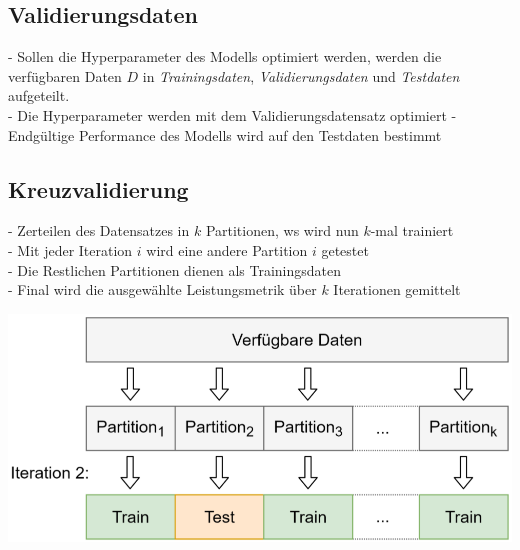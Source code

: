 \documentclass{report}
\begin{document}
\subsection{Validierungsdaten}
- Sollen die Hyperparameter des Modells optimiert werden, werden die verfügbaren Daten $D$
in \textit{Trainingsdaten}, \textit{Validierungsdaten} und \textit{Testdaten} aufgeteilt.\\
- Die Hyperparameter werden mit dem Validierungsdatensatz optimiert
- Endgültige Performance des Modells wird auf den Testdaten bestimmt

\subsection{Kreuzvalidierung}
- Zerteilen des Datensatzes in $k$ Partitionen, ws wird nun $k$-mal trainiert\\
- Mit jeder Iteration $i$ wird eine andere Partition $i$ getestet\\
- Die Restlichen Partitionen dienen als Trainingsdaten\\
- Final wird die ausgewählte Leistungsmetrik über $k$ Iterationen gemittelt
\begin{center}
  \includegraphics[scale=.225]{ml02_9}
\end{center}
\end{document}

